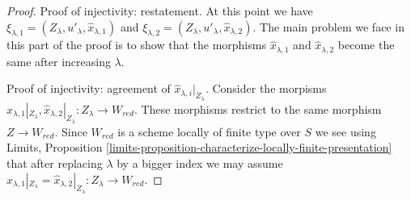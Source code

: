 \begin{proof}
\medskip\noindent
Proof of injectivity: restatement.
At this point we have
$\xi_{\lambda, 1} = (Z_\lambda, u'_\lambda, \hat x_{\lambda, 1})$ and
$\xi_{\lambda, 2} = (Z_\lambda, u'_\lambda, \hat x_{\lambda, 2})$.
The main problem we face in this part of the proof
is to show that the morphisms
$\hat x_{\lambda, 1}$ and $\hat x_{\lambda, 2}$ become the same after
increasing $\lambda$.

\medskip\noindent
Proof of injectivity: agreement of $\hat x_{\lambda, i}|_{Z_\lambda}$.
Consider the morpisms
$\hat x_{\lambda, 1}|_{Z_\lambda}, \hat x_{\lambda, 2}|_{Z_\lambda} :
Z_\lambda \to W_{red}$.
These morphisms restrict to the same morphism $Z \to W_{red}$.
Since $W_{red}$ is a scheme locally of finite type over $S$
we see using Limits, Proposition
\ref{limits-proposition-characterize-locally-finite-presentation}
that after replacing $\lambda$ by a bigger index
we may assume
$\hat x_{\lambda, 1}|_{Z_\lambda} = \hat x_{\lambda, 2}|_{Z_\lambda} :
Z_\lambda \to W_{red}$.


\end{proof}
